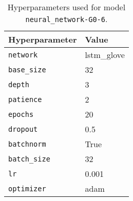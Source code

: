 \begin{table}[H]
\centering
\capstart
\begin{tabularx}{0.48\textwidth}{|X|l|}
\hline
Hyperparameter & Value \\
\hline
\texttt{network} & lstm\_glove \\
\texttt{base\_size} & 32 \\
\texttt{depth} & 3 \\
\texttt{patience} & 2 \\
\texttt{epochs} & 20 \\
\texttt{dropout} & 0.5 \\
\texttt{batchnorm} & True \\
\texttt{batch\_size} & 32 \\
\texttt{lr} & 0.001 \\
\texttt{optimizer} & adam \\
\hline
\end{tabularx}
\caption{Hyperparameters used for model \texttt{neural\_network-G0-6}.}
\label{tab:hyperparameters_best_neural_network}

\end{table}
